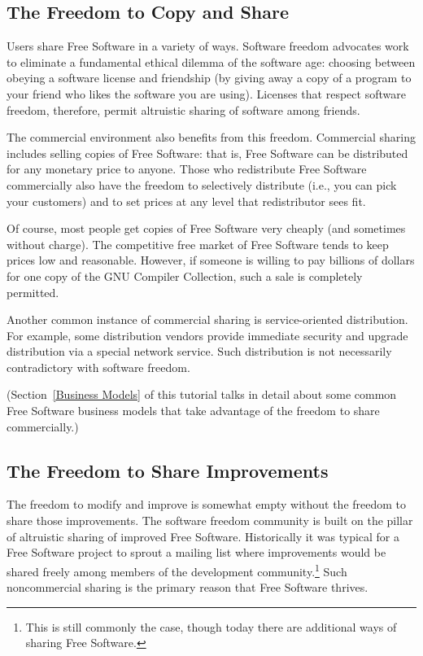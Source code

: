 \subsection{The Freedom to Copy and Share}

Users share Free Software in a variety of ways. Software freedom advocates
work to eliminate a fundamental ethical dilemma of the software age: choosing
between obeying a software license and friendship (by giving away a copy of a
program to your friend who likes the software you are using). Licenses that
respect software freedom, therefore, permit altruistic sharing of software
among friends.

The commercial environment also benefits from this freedom.  Commercial sharing
includes selling copies of Free Software: that is, Free Software can
be distributed for any monetary
price to anyone.  Those who redistribute Free Software commercially also have
the freedom to selectively distribute (i.e., you can pick your customers) and
to set prices at any level that redistributor sees fit.

Of course, most people get copies of Free Software very cheaply (and
sometimes without charge).  The competitive free market of Free Software
tends to keep prices low and reasonable.  However, if someone is willing to
pay billions of dollars for one copy of the GNU Compiler Collection, such a
sale is completely permitted.

Another common instance of commercial sharing is service-oriented
distribution.  For example, some distribution vendors provide immediate
security and upgrade distribution via a special network service.  Such
distribution is not necessarily contradictory with software freedom.

(Section~\ref{Business Models} of this tutorial talks in detail about some
common Free Software business models that take advantage of the freedom to
share commercially.)

\subsection{The Freedom to Share Improvements}

The freedom to modify and improve is somewhat empty without the freedom to
share those improvements.  The software freedom community is built on the
pillar of altruistic sharing of improved Free Software. Historically
it was typical for a
Free Software project to sprout a mailing list where improvements
would be shared
freely among members of the development community.\footnote{This is still
commonly the case, though today there are additional ways of
sharing Free Software.}  Such noncommercial
sharing is the primary reason that Free Software thrives.

